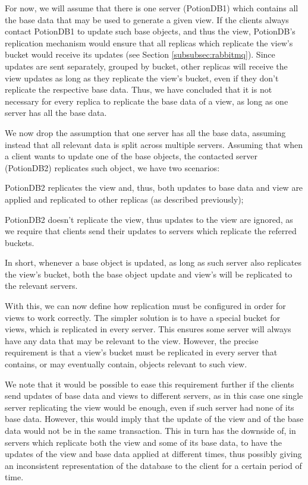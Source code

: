 \documentclass{vldb}
\begin{document}
For now, we will assume that there is one server (PotionDB1) which contains all the base data that may be used to generate a given view.
If the clients always contact PotionDB1 to update such base objects, and thus the view, PotionDB's replication mechanism would ensure that all replicas which replicate the view's bucket would receive its updates (see Section \ref{subsubsec:rabbitmq}).
Since updates are sent separately, grouped by bucket, other replicas will receive the view updates as long as they replicate the view's bucket, even if they don't replicate the respective base data.
Thus, we have concluded that it is not necessary for every replica to replicate the base data of a view, as long as one server has all the base data.

We now drop the assumption that one server has all the base data, assuming instead that all relevant data is split across multiple servers.
Assuming that when a client wants to update one of the base objects, the contacted server (PotionDB2) replicates such object, we have two scenarios:
\begin{enumerate*}[label=(\roman*)]
	\item PotionDB2 replicates the view and, thus, both updates to base data and view are applied and replicated to other replicas (as described previously);
	\item PotionDB2 doesn't replicate the view, thus updates to the view are ignored, as we require that clients send their updates to servers which replicate the referred buckets.
\end{enumerate*}
In short, whenever a base object is updated, as long as such server also replicates the view's bucket, both the base object update and view's will be replicated to the relevant servers.

With this, we can now define how replication must be configured in order for views to work correctly.
The simpler solution is to have a special bucket for views, which is replicated in every server.
This ensures some server will always have any data that may be relevant to the view.
However, the precise requirement is that a view's bucket must be replicated in every server that contains, or may eventually contain, objects relevant to such view.

We note that it would be possible to ease this requirement further if the clients send updates of base data and views to different servers, as in this case one single server replicating the view would be enough, even if such server had none of its base data.
However, this would imply that the update of the view and of the base data would not be in the same transaction.
This in turn has the downside of, in servers which replicate both the view and some of its base data, to have the updates of the view and base data applied at different times, thus possibly giving an inconsistent representation of the database to the client for a certain period of time.
\end{document}
